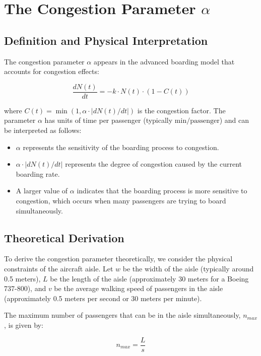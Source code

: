 \documentclass[12pt,a4paper]{article}
\begin{document}
\section{The Congestion Parameter $\alpha$}

\subsection{Definition and Physical Interpretation}

The congestion parameter $\alpha$ appears in the advanced boarding model that accounts for congestion effects:

\begin{equation}
\frac{dN(t)}{dt} = -k \cdot N(t) \cdot (1 - C(t))
\end{equation}

where $C(t) = \min(1, \alpha \cdot |dN(t)/dt|)$ is the congestion factor. The parameter $\alpha$ has units of time per passenger (typically $\text{min/passenger}$) and can be interpreted as follows:

\begin{itemize}
    \item $\alpha$ represents the sensitivity of the boarding process to congestion.
    \item $\alpha \cdot |dN(t)/dt|$ represents the degree of congestion caused by the current boarding rate.
    \item A larger value of $\alpha$ indicates that the boarding process is more sensitive to congestion, which occurs when many passengers are trying to board simultaneously.
\end{itemize}

\subsection{Theoretical Derivation}

To derive the congestion parameter theoretically, we consider the physical constraints of the aircraft aisle. Let $w$ be the width of the aisle (typically around 0.5 meters), $L$ be the length of the aisle (approximately 30 meters for a Boeing 737-800), and $v$ be the average walking speed of passengers in the aisle (approximately 0.5 meters per second or 30 meters per minute).

The maximum number of passengers that can be in the aisle simultaneously, $n_{max}$, is given by:

\begin{equation}
n_{max} = \frac{L}{s}
\end{equation}
\end{document}

